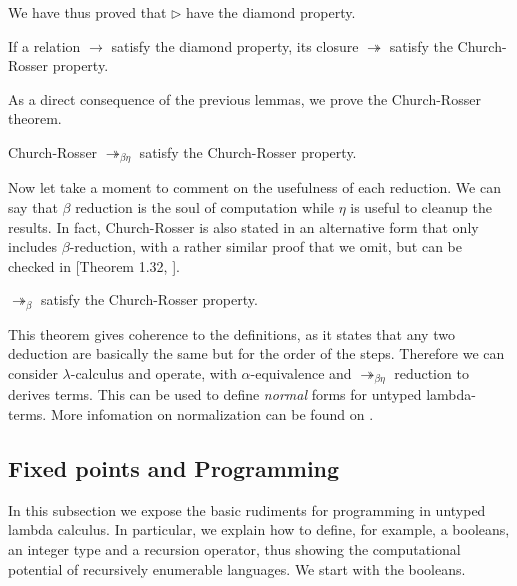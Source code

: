\begin{remark}
  We have thus proved that $\triangleright$ have the diamond property.
\end{remark}

\begin{remark}
  If a relation $\to$ satisfy the diamond property, its closure $\twoheadrightarrow$ satisfy the Church-Rosser property.
\end{remark}


As a direct consequence of the previous lemmas, we prove the Church-Rosser theorem.
\begin{theorem}{Church-Rosser}
  $\twoheadrightarrow_{\beta\eta}$ satisfy the Church-Rosser property.
\end{theorem}

Now let take a moment to comment on the usefulness of each reduction. We can say that $\beta$ reduction is the soul of computation  while $\eta$ is useful to cleanup the results. In fact, Church-Rosser is also stated in an alternative form that only includes $\beta$-reduction, with a rather similar proof that we omit, but can be checked in [Theorem 1.32, \cite{hindley2008lambda}].

\begin{theorem}
  $\twoheadrightarrow_{\beta}$ satisfy the Church-Rosser property.
\end{theorem}

This theorem gives coherence to the definitions, as it states that any two deduction are basically the same but for the order of the steps. Therefore we can consider $\lambda$-calculus and operate, with $\alpha$-equivalence and $\twoheadrightarrow_{\beta\eta}$ reduction to derives terms. This can be used to define \emph{normal} forms for untyped lambda-terms. More infomation on normalization can be found on \cite{selinger2008lecture}. \\





\subsection{Fixed points and Programming}
In this subsection we expose the basic rudiments for programming in untyped lambda calculus. In particular, we explain how to define, for example, a booleans, an integer type and a recursion operator, thus showing the computational potential of recursively enumerable languages. We start with the booleans.

